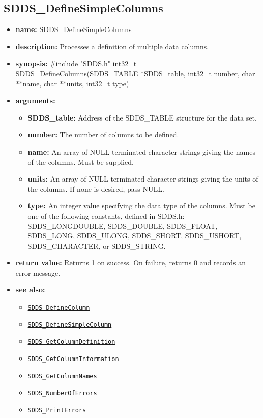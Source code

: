 \documentclass[11pt]{article}
\newcommand{\progref}[1]{\hyperref[SDDS_#1]{\tt SDDS\_#1}}
\begin{document}
\subsection{SDDS\_DefineSimpleColumns}
\label{SDDS_DefineSimpleColumns}

\begin{itemize}
\item {\bf name:}\newline
SDDS\_DefineSimpleColumns
\item {\bf description:}\newline
Processes a definition of multiple data columns.
\item {\bf synopsis:} \#include "SDDS.h"\newline
int32\_t SDDS\_DefineColumns(SDDS\_TABLE *SDDS\_table, int32\_t number, char **name, char **units, int32\_t type)
\item {\bf arguments:}
\begin{itemize}
\item {\bf SDDS\_table:} Address of the SDDS\_TABLE structure for the data set.
\item {\bf number:} The number of columns to be defined.
\item {\bf name:} An array of NULL-terminated character strings giving the names of the columns. Must be supplied.
\item {\bf units:} An array of NULL-terminated character strings giving the units of the columns. If none is desired, pass NULL.
\item {\bf type:} An integer value specifying the data type of the columns. Must be one of the following constants, defined in  SDDS.h: SDDS\_LONGDOUBLE, SDDS\_DOUBLE, SDDS\_FLOAT, SDDS\_LONG, SDDS\_ULONG, SDDS\_SHORT, SDDS\_USHORT, SDDS\_CHARACTER, or SDDS\_STRING.
\end{itemize}
\item {\bf return value:}\newline
Returns 1 on success. On failure, returns 0 and records an error message.
\item {\bf see also:}
\begin{itemize}
\item \progref{DefineColumn}
\item \progref{DefineSimpleColumn}
\item \progref{GetColumnDefinition}
\item \progref{GetColumnInformation}
\item \progref{GetColumnNames}
\item \progref{NumberOfErrors}
\item \progref{PrintErrors}
\end{itemize}
\end{itemize}
\end{document}
